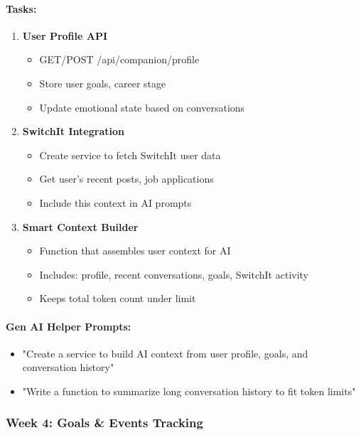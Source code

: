\documentclass[12pt,a4paper]{article}
\begin{document}
\paragraph{Tasks:}
\begin{enumerate}[leftmargin=*]
    \item \textbf{User Profile API}
    \begin{itemize}
        \item GET/POST /api/companion/profile
        \item Store user goals, career stage
        \item Update emotional state based on conversations
    \end{itemize}
    
    \item \textbf{SwitchIt Integration}
    \begin{itemize}
        \item Create service to fetch SwitchIt user data
        \item Get user's recent posts, job applications
        \item Include this context in AI prompts
    \end{itemize}
    
    \item \textbf{Smart Context Builder}
    \begin{itemize}
        \item Function that assembles user context for AI
        \item Includes: profile, recent conversations, goals, SwitchIt activity
        \item Keeps total token count under limit
    \end{itemize}
\end{enumerate}

\paragraph{Gen AI Helper Prompts:}
\begin{itemize}
    \item "Create a service to build AI context from user profile, goals, and conversation history"
    \item "Write a function to summarize long conversation history to fit token limits"
\end{itemize}

\subsubsection{Week 4: Goals \& Events Tracking}
\end{document}
